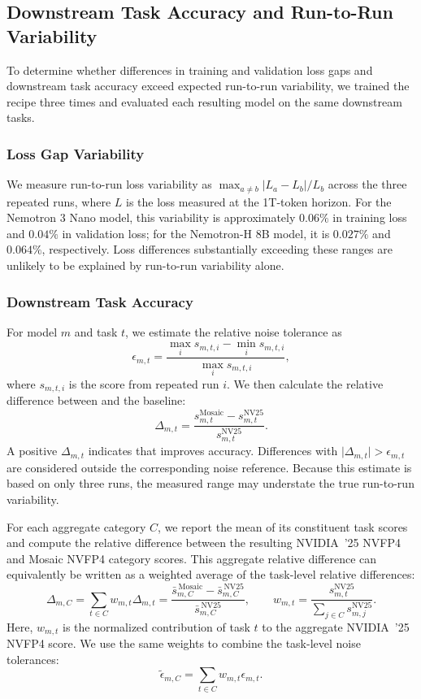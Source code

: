 \subsection{Downstream Task Accuracy and Run-to-Run Variability}

To determine whether differences in training and validation loss gaps and downstream task accuracy exceed expected
run-to-run variability, we trained the \nvrecipe recipe three times and evaluated each
resulting model on the same downstream tasks. 

\subsubsection{Loss Gap Variability}
\label{app:loss-variability}
We measure run-to-run loss variability as
$\max_{a \neq b} |L_a-L_b|/L_b$ across the three repeated runs, where $L$ is the loss measured at the 1T-token horizon.
For the Nemotron 3 Nano model, this variability is approximately \(0.06\%\) in training loss and \(0.04\%\) in validation loss; for the Nemotron-H 8B model, it is \(0.027\%\) and \(0.064\%\), respectively. Loss differences substantially exceeding these ranges are unlikely to be explained by run-to-run variability alone.

\subsubsection{Downstream Task Accuracy}
For model $m$ and task $t$, we
estimate the relative noise tolerance as
\begin{equation}
    \epsilon_{m,t} =
    \frac{\max_i s_{m,t,i} - \min_i s_{m,t,i}}
         {\max_i s_{m,t,i}},
\end{equation}
where $s_{m,t,i}$ is the score from repeated run $i$. We then calculate the
relative difference between \newrecipe and the \nvrecipe baseline:
\begin{equation}
    \Delta_{m,t} =
    \frac{s_{m,t}^{\mathrm{Mosaic}} -
          s_{m,t}^{\mathrm{NV25}}}
         {s_{m,t}^{\mathrm{NV25}}}.
\end{equation}
A positive $\Delta_{m,t}$ indicates that \newrecipe improves accuracy.
Differences with $\lvert\Delta_{m,t}\rvert > \epsilon_{m,t}$
are considered outside the corresponding noise reference. Because this estimate is based on only three runs, the measured range may understate the true run-to-run variability.

For each aggregate category $C$, we report the mean of
its constituent task scores and compute the relative difference
between the resulting NVIDIA~'25 NVFP4 and Mosaic NVFP4 category scores.
This aggregate relative difference can equivalently be written as a
weighted average of the task-level relative differences:
\[
\Delta_{m,C}
=
\sum_{t \in C} w_{m,t}\Delta_{m,t}
=
\frac{
\bar{s}^{\,\mathrm{Mosaic}}_{m,C}
-
\bar{s}^{\,\mathrm{NV25}}_{m,C}
}{
\bar{s}^{\,\mathrm{NV25}}_{m,C}
},
\qquad
w_{m,t}
=
\frac{s^{\mathrm{NV25}}_{m,t}}
{\sum_{j \in C}s^{\mathrm{NV25}}_{m,j}}.
\]
Here, $w_{m,t}$ is the normalized contribution of task $t$ to the
aggregate NVIDIA~'25 NVFP4 score. We use the same weights to combine
the task-level noise tolerances:
\[
\widetilde{\epsilon}_{m,C}
=
\sum_{t \in C}w_{m,t}\epsilon_{m,t}.
\]

